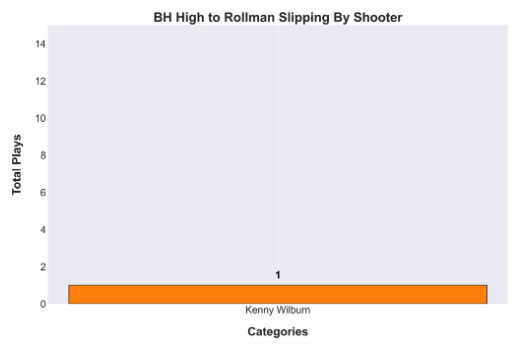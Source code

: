\documentclass[a4paper,12pt]{article}
\begin{document}
\begin{table}[H]
{\begin{minipage}[t]{0.6\textwidth}
{\begin{tabular}
                
            
                
            

            \bottomrule
        \end{tabular}
        } %
    \end{minipage}
    } %
    \hfill %
    \begin{minipage}[c]{0.35\textwidth} %
        \flushright
        \includegraphics[width=\textwidth, height=.14\textheight]{images/PNR_PassHighSlipsPlayer_Freq.png} %
    \end{minipage}
\end{table}

\vspace{-1em} %
\vspace{-1em} %
\end{document}
